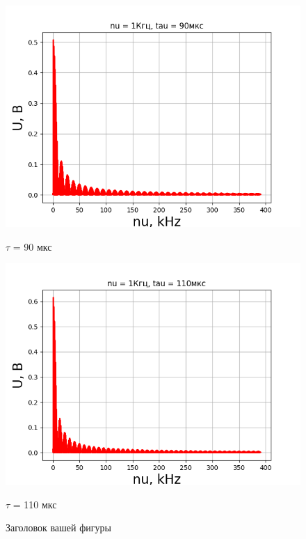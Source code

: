 \documentclass[a4paper,12pt]{article}
\theoremstyle{definition}
\begin{document}
\begin{enumerate}
\begin{figure}[h!]
\vspace{0.5cm} %
\begin{minipage}[t]{0.45\linewidth} %
    \centering
    \includegraphics[width=\linewidth]{nu=1kHztau=90mks.png} 
    \caption*{$\tau$ = 90 мкс}
\end{minipage}
\hfill
\begin{minipage}[t]{0.45\linewidth} %
    \centering
    \includegraphics[width=\linewidth]{nu=1kHztau=110mks.png} 
    \caption*{$\tau$ = 110 мкс}
\end{minipage}

\caption{Заголовок вашей фигуры} %
\label{ris:experimentalcorrelationsignals}
\end{figure}


\end{enumerate}
\end{document}

